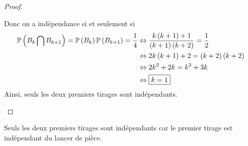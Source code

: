 \documentclass[12pt]{article}
\begin{document}
\begin{proof}
\begin{enumerate}
        Donc on a indépendance si et seulement si 
        \begin{align}
            \P\left(B_{k}\bigcap B_{k+1}\right)=\P\left(B_{k}\right)\P\left(B_{k+1}\right)=\frac{1}{4}
            &\Leftrightarrow \frac{k\left(k+1\right)+1}{\left(k+1\right)\left(k+2\right)}=\frac{1}{2}\\
            &\Leftrightarrow 2k\left(k+1\right)+2=\left(k+2\right)\left(k+2\right)\\
            &\Leftrightarrow 2k^{2}+2k=k^{2}+3k\\
            &\Leftrightarrow \boxed{k=1}
        \end{align}
        Ainsi, seuls les deux premiers tirages sont indépendants.
    \end{enumerate}
\end{proof}

\begin{remark}
    Seuls les deux premiers tirages sont indépendants car le premier tirage est indépendant du lancer de pièce.
\end{remark}
\end{document}
